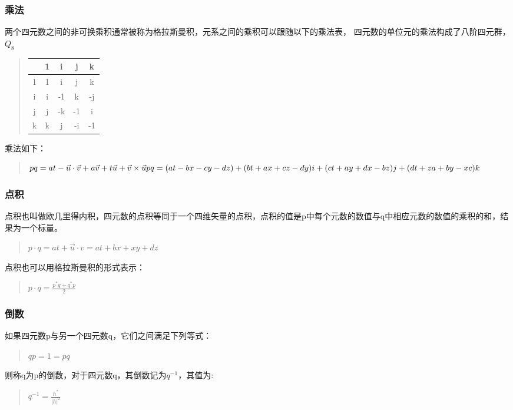\documentclass[a4paper,10pt]{article}
\begin{document}
\begin{CJK}{UTF8}{song}
\subsubsection{乘法}
两个四元数之间的非可换乘积通常被称为格拉斯曼积，元系之间的乘积可以跟随以下的乘法表， 四元数的单位元的乘法构成了八阶四元群，$Q_{8}$
\begin{quote}
\begin{tabular}{c|c|c|c|c}
 & 1 & i & j & k \\ 
\hline 
1 & 1 & i & j & k \\
\hline 
i & i & -1 & k & -j \\
\hline 
j & j & -k & -1 & i \\
\hline 
k & k & j & -i & -1 \\
\end{tabular}
\end{quote}
乘法如下：
\begin{quote}
\begin{math}
pq=at-\vec{u}\cdot\vec{v}+a\vec{v}+t\vec{u}+\vec{v}\times\vec{u} \\
pq=(at-bx-cy-dz)+(bt+ax+cz-dy)i+(ct+ay+dx-bz)j+(dt+za+by-xc)k
\end{math}
\end{quote}
\subsubsection{点积}
点积也叫做欧几里得内积，四元数的点积等同于一个四维矢量的点积，点积的值是p中每个元数的数值与q中相应元数的数值的乘积的和，结果为一个标量。
\begin{quote}
$p\cdot q=at+\vec{u}\cdot{v}=at+bx+xy+dz $
\end{quote}
点积也可以用格拉斯曼积的形式表示：
\begin{quote}
\begin{math}
p\cdot q = \frac{p^{*}q+q^{*}p}{2}
\end{math}
\end{quote}

\subsubsection{倒数}
如果四元数p与另一个四元数q，它们之间满足下列等式：
\begin{quote}
$qp=1=pq$
\end{quote}
则称q为p的倒数，对于四元数q，其倒数记为$q^{-1}$，其值为:
\begin{quote}
$q^{-1}=\frac{h^{*}}{|h|^{2}}$
\end{quote}



























\end{CJK}
\end{document}
